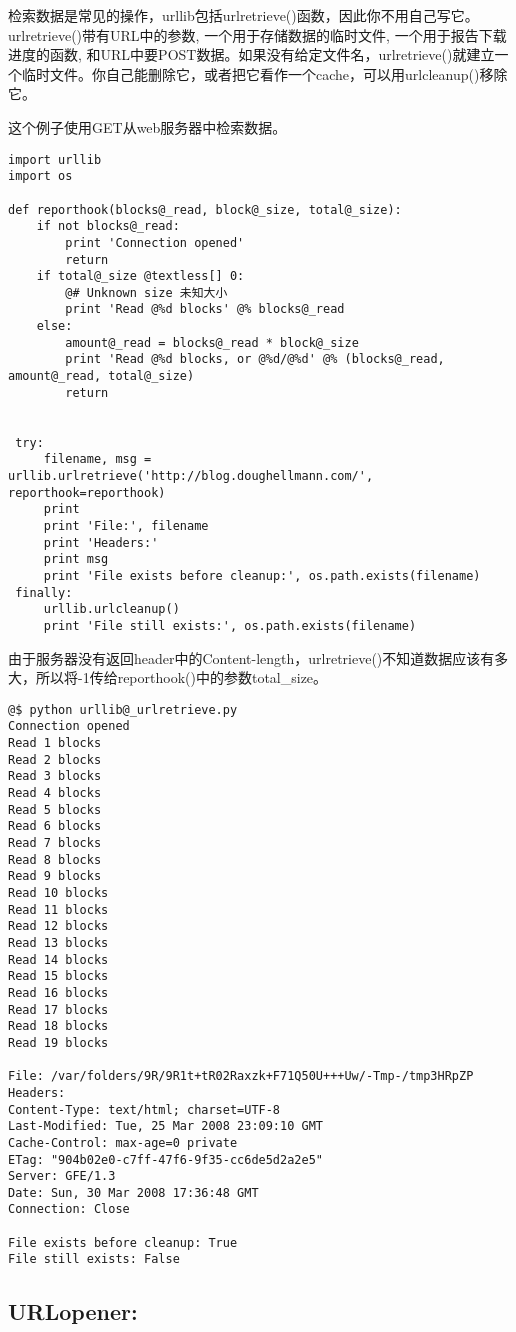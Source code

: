 \documentclass[a4paper,10pt,english]{manual}
\begin{document}
检索数据是常见的操作，urllib包括urlretrieve()函数，因此你不用自己写它。urlretrieve()带有URL中的参数, 一个用于存储数据的临时文件, 一个用于报告下载进度的函数, 和URL中要POST数据。如果没有给定文件名，urlretrieve()就建立一个临时文件。你自己能删除它，或者把它看作一个cache，可以用urlcleanup()移除它。

这个例子使用GET从web服务器中检索数据。

\begin{Verbatim}[commandchars=@\[\]]
import urllib
import os

def reporthook(blocks@_read, block@_size, total@_size):
    if not blocks@_read:
        print 'Connection opened'
        return
    if total@_size @textless[] 0:
        @# Unknown size 未知大小
        print 'Read @%d blocks' @% blocks@_read
    else:
        amount@_read = blocks@_read * block@_size
        print 'Read @%d blocks, or @%d/@%d' @% (blocks@_read, amount@_read, total@_size)
        return


 try:
     filename, msg = urllib.urlretrieve('http://blog.doughellmann.com/', reporthook=reporthook)
     print
     print 'File:', filename
     print 'Headers:'
     print msg
     print 'File exists before cleanup:', os.path.exists(filename)
 finally:
     urllib.urlcleanup()
     print 'File still exists:', os.path.exists(filename)
\end{Verbatim}

由于服务器没有返回header中的Content-length，urlretrieve()不知道数据应该有多大，所以将-1传给reporthook()中的参数total\_size。

\begin{Verbatim}[commandchars=@\[\]]
@$ python urllib@_urlretrieve.py
Connection opened
Read 1 blocks
Read 2 blocks
Read 3 blocks
Read 4 blocks
Read 5 blocks
Read 6 blocks
Read 7 blocks
Read 8 blocks
Read 9 blocks
Read 10 blocks
Read 11 blocks
Read 12 blocks
Read 13 blocks
Read 14 blocks
Read 15 blocks
Read 16 blocks
Read 17 blocks
Read 18 blocks
Read 19 blocks

File: /var/folders/9R/9R1t+tR02Raxzk+F71Q50U+++Uw/-Tmp-/tmp3HRpZP
Headers:
Content-Type: text/html; charset=UTF-8
Last-Modified: Tue, 25 Mar 2008 23:09:10 GMT
Cache-Control: max-age=0 private
ETag: "904b02e0-c7ff-47f6-9f35-cc6de5d2a2e5"
Server: GFE/1.3
Date: Sun, 30 Mar 2008 17:36:48 GMT
Connection: Close

File exists before cleanup: True
File still exists: False
\end{Verbatim}


\subsection{URLopener:}
\end{document}

